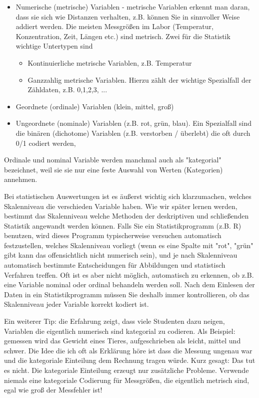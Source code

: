 \documentclass[a4paper,twoside]{tufte-book}\usepackage[]{graphicx}\usepackage[]{color}
\begin{document}
	\begin{itemize}
	  \item Numerische (metrische) Variablen - metrische Variablen erkennt man daran, dass sie sich wie Distanzen verhalten, z.B. können Sie in sinnvoller Weise addiert werden. Die meisten Messgrößen im Labor (Temperatur, Konzentration, Zeit, Längen etc.) sind metrisch. Zwei für die Statistik wichtige Untertypen sind
		\begin{itemize}
  		\item Kontinuierliche metrische Variablen, z.B. Temperatur
  		\item Ganzzahlig metrische Variablen. Hierzu zählt der wichtige Spezialfall der Zähldaten, z.B. 0,1,2,3, ...
		\end{itemize}	  
		\item Geordnete (ordinale) Variablen (klein, mittel, groß)
		\item Ungeordnete (nominale) Variablen (z.B. rot, grün, blau). Ein Spezialfall sind die binären (dichotome) Variablen (z.B. verstorben / überlebt) die oft durch 0/1 codiert werden,
	\end{itemize}
	
	Ordinale und nominal Variable werden manchmal auch als "kategorial" bezeichnet, weil sie sie nur eine feste Auswahl von Werten (Kategorien) annehmen. 
	
	Bei statistischen Auswertungen ist es äußerst wichtig sich klarzumachen, welches Skalenniveau die verschieden Variable haben. Wie wir später lernen werden, bestimmt das Skalenniveau welche Methoden der deskriptiven und schließenden Statistik angewandt werden können. Falls Sie ein Statistikprogramm (z.B. R) benutzen, wird dieses Programm typischerweise versuchen automatisch festzustellen, welches Skalenniveau vorliegt (wenn es eine Spalte mit "rot", "grün" gibt kann das offensichtlich nicht numerisch sein), und je nach Skalenniveau automatisch bestimmte Entscheidungen für Abbildungen und statistisch Verfahren treffen. Oft ist es aber nicht möglich, automatisch zu erkennen, ob z.B. eine Variable nominal oder ordinal behandeln werden soll. Nach dem Einlesen der Daten in ein Statistikprogramm müssen Sie deshalb immer kontrollieren, ob das Skalenniveau jeder Variable korrekt kodiert ist. 
	
	Ein weiterer Tip: die Erfahrung zeigt, dass viele Studenten dazu neigen, Variablen die eigentlich numerisch sind kategorial zu codieren. Als Beispiel: gemessen wird das Gewicht eines Tieres, aufgeschrieben als leicht, mittel und schwer. Die Idee die ich oft als Erklärung höre ist dass die Messung ungenau war und die kategoriale Einteilung dem Rechnung tragen würde. Kurz gesagt: Das tut es nicht. Die kategoriale Einteilung erzeugt nur zusätzliche Probleme. Verwende niemals eine kategoriale Codierung für Messgrößen, die eigentlich metrisch sind, egal wie groß der Messfehler ist!
\end{document}
